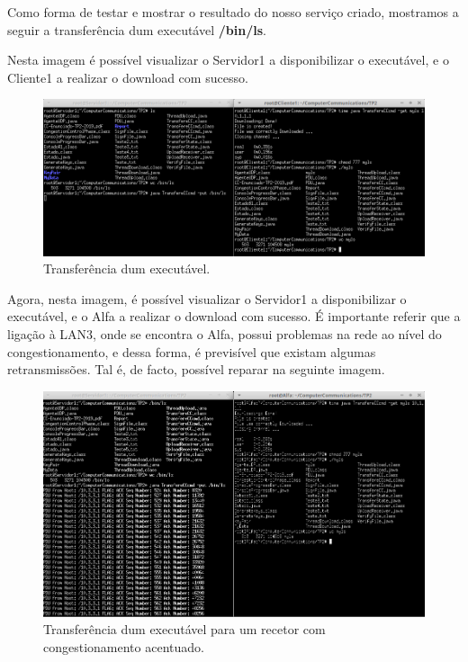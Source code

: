 \documentclass{llncs}
\begin{document}
Como forma de testar e mostrar o resultado do nosso serviço criado, mostramos a seguir a transferência dum executável \textbf{/bin/ls}.

Nesta imagem é possível visualizar o Servidor1 a disponibilizar o executável, e o Cliente1 a realizar o download com sucesso.

\begin{figure}[H]
\begin{center}
\includegraphics[scale=0.4]{myls_cliente1.png}
\end{center}
\caption{Transferência dum executável.}
\end{figure}

Agora, nesta imagem, é possível visualizar o Servidor1 a disponibilizar o executável, e o Alfa a realizar o download com sucesso. É importante referir que a ligação à LAN3, onde se encontra o Alfa, possui problemas na rede ao nível do congestionamento, e dessa forma, é previsível que existam algumas retransmissões. Tal é, de facto, possível reparar na seguinte imagem.

\begin{figure}[H]
\begin{center}
\includegraphics[scale=0.4]{myls_alfa.png}
\end{center}
\caption{Transferência dum executável para um recetor com congestionamento acentuado.}
\end{figure}
\end{document}
